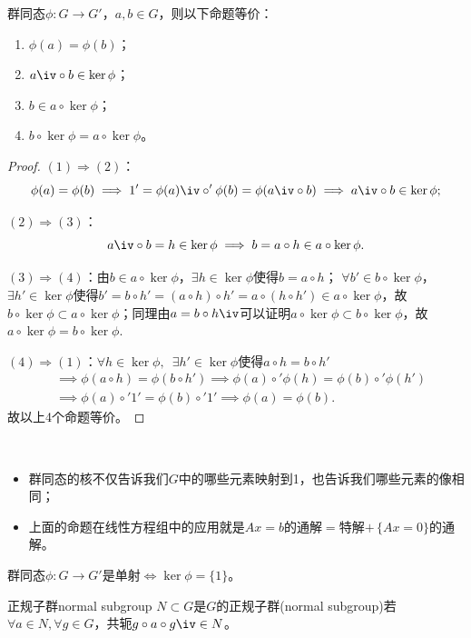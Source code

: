 \begin{theorem}{}{}
	群同态$\phi:G\to G'$，$a,b\in G$，则以下命题等价：
	\begin{enumerate}
		\item $\phi(a)=\phi(b)$；
		\item $a\iv\circ b\in\ker\phi$；
		\item $b\in a\circ\ker\phi$；
		\item $b\circ\ker\phi=a\circ\ker\phi$。
	\end{enumerate}
\end{theorem}
\begin{proof}
	$(1)\Rightarrow(2)$：
	\[
		\phi(a)=\phi(b)\implies 1'=\phi(a)\iv\circ'\phi(b)=\phi(a\iv\circ b)\implies a\iv\circ b\in\ker\phi;
	\]

	$(2)\Rightarrow(3)$：
	\[
		a\iv\circ b=h\in\ker\phi\implies b=a\circ h\in a\circ\ker\phi.
	\]

	$(3)\Rightarrow(4)$：由$b\in a\circ\ker\phi$，$\exists h\in\ker\phi$使得$b=a\circ h$；
	$\forall b'\in b\circ\ker\phi$，$\exists h'\in \ker\phi$使得$b'=b\circ h'=(a\circ h)\circ h'=a\circ(h\circ h')\in a\circ\ker\phi$，故$b\circ\ker\phi\subset a\circ\ker\phi$；同理由$a=b\circ h\iv$可以证明$a\circ\ker\phi\subset b\circ\ker\phi$，故$a\circ\ker\phi=b\circ\ker\phi.$

	$(4)\Rightarrow(1)$：$\forall h\in\ker\phi,\enspace\exists h'\in\ker\phi$使得$a\circ h=b\circ h'$
	\begin{align*}
		&\implies \phi(a\circ h)=\phi(b\circ h')\implies\phi(a)\circ'\phi(h)=\phi(b)\circ'\phi(h')\\
		&\implies\phi(a)\circ'1'=\phi(b)\circ'1'\implies\phi(a)=\phi(b).
	\end{align*}
	故以上4个命题等价。
\end{proof}
\begin{remark}~
	\begin{itemize}
		\item 群同态的核不仅告诉我们$G$中的哪些元素映射到1，也告诉我们哪些元素的像相同；
		\item 上面的命题在线性方程组中的应用就是$Ax=b$的通解$=$特解$+\,\{Ax=0\}$的通解。
	\end{itemize}
\end{remark}
\begin{corollary}
	群同态$\phi:G\to G'$是单射$\iff\ker\phi=\{1\}$。
\end{corollary}
\begin{definition}{正规子群}{normal subgroup}
	$N\subset G$是$G$的正规子群(normal subgroup)若$\forall a\in N,\forall g\in G$，共轭$g\circ a\circ g\iv\in N$。
\end{definition}

